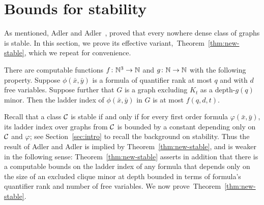 
\section{Bounds for stability}\label{sec:stable}
As mentioned, Adler and Adler~\cite{adler2014interpreting}, 
proved that every nowhere dense class of graphs is stable. In this section,
we prove its effective variant,~Theorem~\ref{thm:new-stable}, which 
we repeat for convenience.
 \setcounter{aux}{\thetheorem}
 \setcounter{theorem}{\thestable}
 \begin{theorem}
 There are computable functions $f\colon \N^3\to\N$ and $g\colon\N\to\N$ with the following property.
 Suppose $\phi(\bar x,\bar y)$ is a formula of quantifier rank at most $q$ and with $d$ free variables.
 Suppose further that $G$ is a graph excluding $K_t$ as a depth-$g(q)$ minor. Then the ladder index of $\phi(\bar x,\bar y)$ in $G$ is at most $f(q,d,t)$.
 \end{theorem}
 \setcounter{theorem}{\theaux}

Recall that a class $\cal C$ is stable if and only if for every first order formula $\varphi(\bar x,\bar y)$, 
its ladder index over graphs from $\cal C$ is bounded by a constant depending only on $\cal C$ and $\varphi$;
see Section~\ref{sec:intro} to recall the background on stability.
Thus the result of Adler and Adler is implied by Theorem~\ref{thm:new-stable},
and is weaker in the following sense: Theorem~\ref{thm:new-stable} asserts in addition that there is a computable bounds on the ladder index
of any formula that depends only on the size of an excluded clique minor at depth bounded in terms of formula's quantifier rank and number of free variables. 
We now prove~Theorem~\ref{thm:new-stable}.

